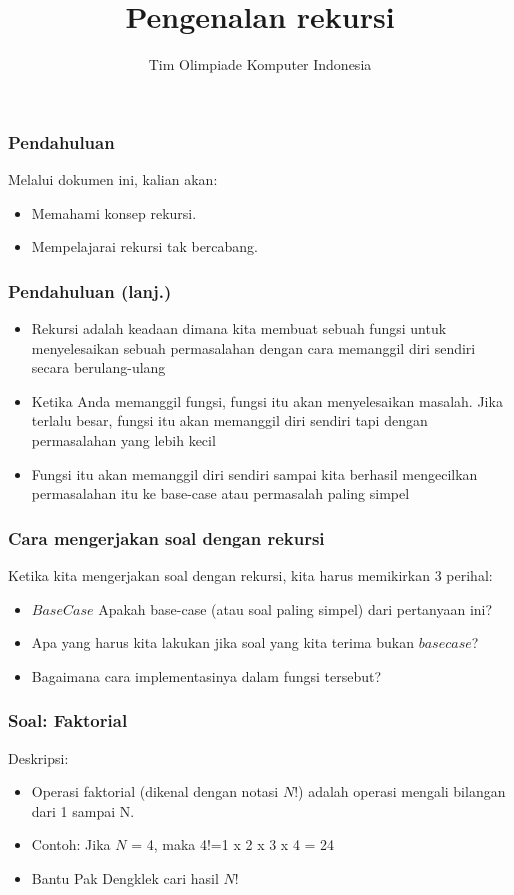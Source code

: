 \documentclass{beamer}
\title{Pengenalan rekursi}
\author{Tim Olimpiade Komputer Indonesia}
\begin{document}
 
\begin{frame}
\titlepage
\end{frame}
 
\begin{frame}
\frametitle{Pendahuluan}
Melalui dokumen ini, kalian akan:
\begin{itemize}
        \item Memahami konsep rekursi.
        \item Mempelajarai rekursi tak bercabang.
\end{itemize}
\end{frame}
 
\begin{frame}
\frametitle{Pendahuluan (lanj.) }
\begin{itemize}
        \item Rekursi adalah keadaan dimana kita membuat sebuah fungsi untuk menyelesaikan sebuah permasalahan dengan cara memanggil diri sendiri secara berulang-ulang
        \item Ketika Anda memanggil fungsi, fungsi itu akan menyelesaikan masalah. Jika terlalu besar, fungsi itu akan memanggil diri sendiri tapi dengan permasalahan yang lebih kecil
        \item Fungsi itu akan memanggil diri sendiri sampai kita berhasil mengecilkan permasalahan itu ke base-case atau permasalah paling simpel
\end{itemize}
\end{frame}

\begin{frame}
\frametitle{Cara mengerjakan soal dengan rekursi }
Ketika kita mengerjakan soal dengan rekursi, kita harus memikirkan 3 perihal:
\begin{itemize}
        \item $Base Case$ Apakah base-case (atau soal paling simpel) dari pertanyaan ini?
        \item Apa yang harus kita lakukan jika soal yang kita terima bukan $base case$?
        \item Bagaimana cara implementasinya dalam fungsi tersebut?
\end{itemize}
\end{frame}
 
\begin{frame}
\frametitle{Soal: Faktorial}
Deskripsi:
\begin{itemize}
        \item Operasi faktorial (dikenal dengan notasi $N$!) adalah operasi mengali bilangan dari 1 sampai N.
        \item Contoh: Jika $N$ = 4, maka 4!=1 x 2 x 3 x 4 = 24
        \item Bantu Pak Dengklek cari hasil $N$!
\end{itemize}
\end{frame}
 
\end{document}
